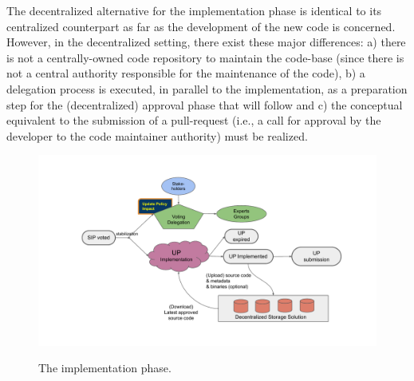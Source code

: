 
The decentralized alternative for the implementation phase is identical to its centralized counterpart as far as the development of the new code is concerned. However, in the decentralized setting, there exist these major differences:
a) there is not a centrally-owned code repository to maintain the code-base (since there is not a central authority responsible for the maintenance of the code), b) a delegation process is executed, in parallel to the implementation, as a preparation step for the (decentralized) approval phase that will follow and c) the conceptual equivalent to the submission of a pull-request (i.e., a call for approval by the developer to the code maintainer authority) must be realized.

\begin{figure}[h!] %
    \caption{The implementation phase.}
    \centering
    \includegraphics[width=1.0 \columnwidth,keepaspectratio]{figures/implementation_phase.pdf}
    \label{implementation}
\end{figure}

